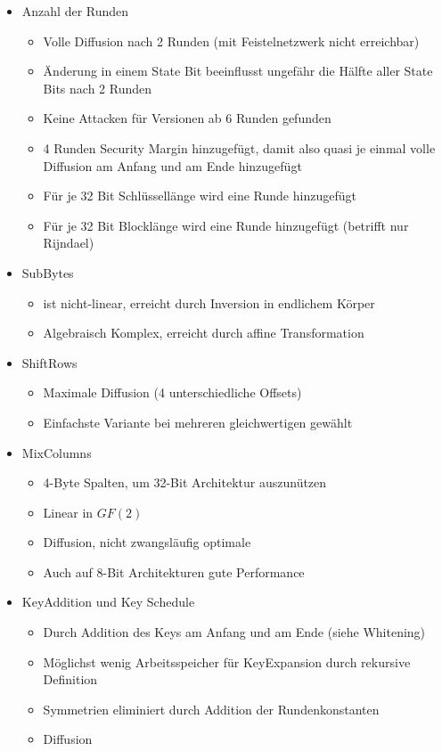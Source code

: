 \begin{itemize}
    \item Anzahl der Runden
    \begin{itemize}
        \item Volle Diffusion nach 2 Runden (mit Feistelnetzwerk nicht erreichbar)
        \item Änderung in einem State Bit beeinflusst ungefähr die Hälfte aller State Bits nach 2 Runden
        \item Keine Attacken für Versionen ab 6 Runden gefunden
        \item 4 Runden Security Margin hinzugefügt, damit also quasi je einmal volle Diffusion am Anfang und am Ende hinzugefügt
        \item Für je 32 Bit Schlüssellänge wird eine Runde hinzugefügt
        \item Für je 32 Bit Blocklänge wird eine Runde hinzugefügt (betrifft nur Rijndael)
    \end{itemize}
    \item SubBytes
    \begin{itemize}
        \item ist nicht-linear, erreicht durch Inversion in endlichem Körper
        \item Algebraisch Komplex, erreicht durch affine Transformation
    \end{itemize}
    \item ShiftRows
    \begin{itemize}
        \item Maximale Diffusion (4 unterschiedliche Offsets)
        \item Einfachste Variante bei mehreren gleichwertigen gewählt
    \end{itemize}
    \item MixColumns
    \begin{itemize}
        \item 4-Byte Spalten, um 32-Bit Architektur auszunützen
        \item Linear in $GF(2)$
        \item Diffusion, nicht zwangsläufig optimale
        \item Auch auf 8-Bit Architekturen gute Performance
    \end{itemize}
    \item KeyAddition und Key Schedule
    \begin{itemize}
        \item Durch Addition des Keys am Anfang und am Ende (siehe Whitening)
        \item Möglichst wenig Arbeitsspeicher für KeyExpansion durch rekursive Definition
        \item Symmetrien eliminiert durch Addition der Rundenkonstanten
        \item Diffusion
    \end{itemize}
\end{itemize}

